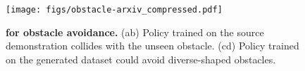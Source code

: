 \begin{figure}
    \centering
    \texttt{[image: figs/obstacle-arxiv\_compressed.pdf]}
    \caption{\textbf{\method for obstacle avoidance.} (ab) Policy trained on the source demonstration collides with the unseen obstacle. (cd) Policy trained on the generated dataset could avoid diverse-shaped obstacles.}
    \label{fig:real-obstacle}
    \vspace{-0.2cm}
\end{figure}